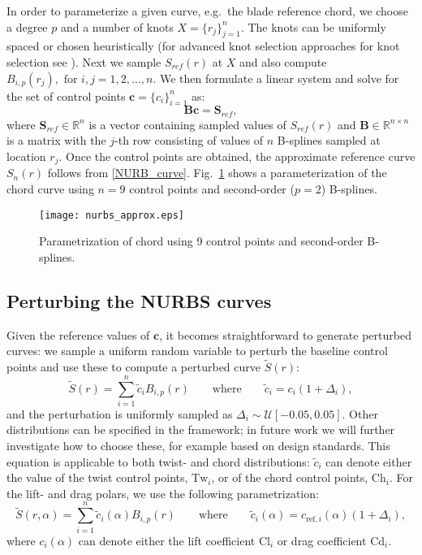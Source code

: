 In order to parameterize a given curve, e.g.\ the blade reference chord, we choose a degree $p$ and a number of knots $X =\{r_j\}_{j=1}^n$. The knots can be uniformly spaced or chosen heuristically (for advanced knot selection approaches for knot selection see \cite{Li2005}). Next we sample $S_{ref}(r)$ at $X$ and also compute $B_{i,p}(r_j), \text{ for }i, j = 1,2, ..., n$. We then formulate a linear system and solve for the set of control points $\mathbf{c}=\{c_i\}_{i=1}^n$ as:
\begin{equation}\label{nurbs_inversion}
\mathbf{B}\mathbf{c} = \mathbf{S}_{ref},
\end{equation}
where $\mathbf{S}_{ref}\in\mathbb{R}^{n}$ is a vector containing sampled values of $S_{ref}(r)$ and $\mathbf{B}\in \mathbb{R}^{n\times n}$ is a matrix with the $j$-th row consisting of values of $n$ B-splines sampled at location $r_j$. Once the control points are obtained, the approximate reference curve $S_n(r)$ follows from \eqref{NURB_curve}. Fig.~\ref{nurbs_approx} shows a parameterization of the chord curve using $n=9$ control points and second-order ($p=2$) B-splines.
\begin{figure}[h!]
\centering
\texttt{[image: nurbs\_approx.eps]}
\caption{Parametrization of chord using 9 control points and second-order B-splines.}
\label{nurbs_approx}
\end{figure}

\subsection{Perturbing the NURBS curves}
Given the reference values of $\mathbf{c}$, it becomes straightforward to generate perturbed curves: we sample a uniform random variable to perturb the baseline control points and use these to compute a perturbed curve $\tilde{S}(r)$:
\begin{equation}\label{eqn:perturb_c}
\tilde{S} (r) = \sum_{i=1}^{n} \tilde{c}_{i} B_{i,p}(r) \qquad \text{where} \qquad \tilde{c}_{i} = c_{i} (1 + \Delta_{i}),
\end{equation}
and the perturbation is uniformly sampled as $\Delta_{i} \sim \mathcal{U}[-0.05,0.05]$. Other distributions can be specified in the framework; in future work we will further investigate how to choose these, for example based on design standards. This equation is applicable to both twist- and chord distributions: $\tilde{c}_{i}$ can denote either the value of the twist control points, $\text{Tw}_i$, or of the chord control points, $\text{Ch}_{i}$. For the lift- and drag polars, we use the following parametrization:
\begin{equation}\label{eqn:perturb_cl}
\tilde{S} (r,\alpha) = \sum_{i=1}^{n} \tilde{c}_{i}(\alpha) B_{i,p}(r) \qquad \text{where} \qquad \tilde{c}_{i}(\alpha) = c_{\text{ref},i} (\alpha) (1 + \Delta_{i}),
\end{equation}
where $c_{i}(\alpha)$ can denote either the lift coefficient $\text{Cl}_{i}$ or drag coefficient $\text{Cd}_{i}$.%

